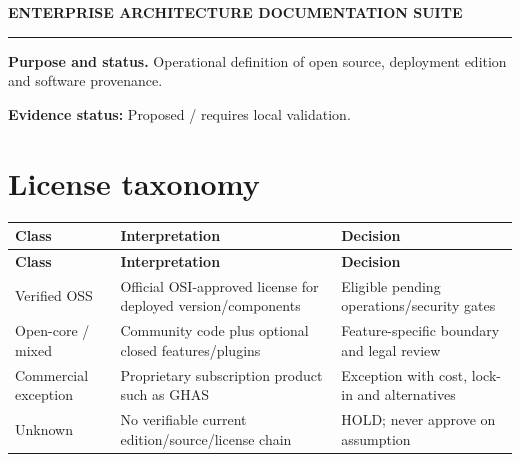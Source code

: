 \documentclass[10pt,letterpaper]{article}
\begin{document}
\begin{center}
{\large\bfseries\color{teal} ENTERPRISE ARCHITECTURE DOCUMENTATION SUITE}\par
{}\par
{}\par
\end{center}
\vspace{8pt}\hrule\vspace{12pt}
\textbf{Purpose and status.} Operational definition of open source, deployment edition and software provenance.\par
\textbf{Evidence status:} Proposed / requires local validation.\par
\section{License taxonomy}
\small\begin{longtable}{>{\raggedright\arraybackslash}p{}>{\raggedright\arraybackslash}p{}>{\raggedright\arraybackslash}p{}}
\toprule
\textbf{Class} & \textbf{Interpretation} & \textbf{Decision}\\
\midrule\endfirsthead
\toprule
\textbf{Class} & \textbf{Interpretation} & \textbf{Decision}\\
\midrule\endhead
Verified OSS & Official OSI-approved license for deployed version/components & Eligible pending operations/security gates\\
Open-core / mixed & Community code plus optional closed features/plugins & Feature-specific boundary and legal review\\
Commercial exception & Proprietary subscription product such as GHAS & Exception with cost, lock-in and alternatives\\
Unknown & No verifiable current edition/source/license chain & HOLD; never approve on assumption\\
\bottomrule
\end{longtable}
\normalsize
\end{document}
